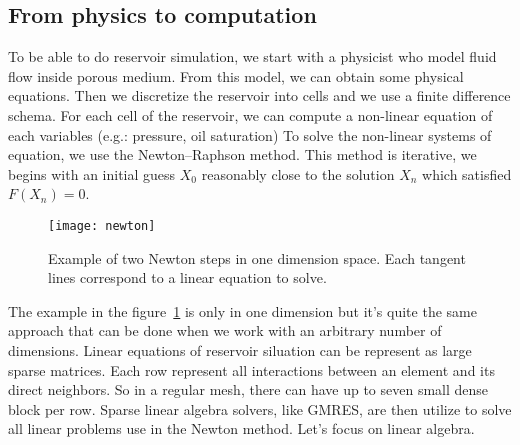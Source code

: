\subsection{From physics to computation}
To be able to do reservoir simulation, we start with a physicist who model fluid flow inside porous medium.
%
From this model, we can obtain some physical equations.
%
Then we discretize the reservoir into cells and we use a finite difference schema.
%
For each cell of the reservoir, we can compute a non-linear equation of each variables (e.g.: pressure, oil saturation)
%
To solve the non-linear systems of equation, we use the Newton–Raphson method.
%
This method is iterative, we begins with an initial guess $X_0$ reasonably close to the solution $X_n$ which satisfied $F(X_n) = 0$.

\begin{figure}[!ht]
  \centering
  \texttt{[image: newton]}
  \caption{Example of two Newton steps in one dimension space.
    Each tangent lines correspond to a linear equation to solve.}
\label{newton}
\end{figure}

The example in the figure~\ref{newton} is only in one dimension but it's quite the same approach that can be done when we work with an arbitrary number of dimensions.
%
Linear equations of reservoir siluation can be represent as large sparse matrices.
%
Each row represent all interactions between an element and its direct neighbors.
%
So in a regular mesh, there can have up to seven small dense block per row.
%
Sparse linear algebra solvers, like GMRES, are then utilize to solve all linear problems use in the Newton method.
%
Let's focus on linear algebra.
